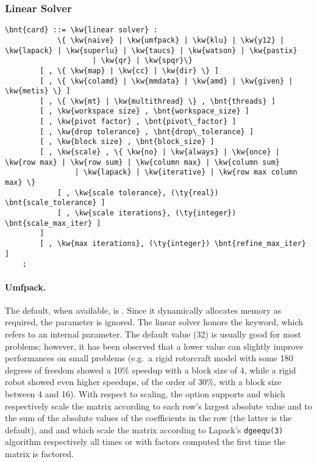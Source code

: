 \subsubsection{Linear Solver}   
\label{sec:LINEAR-SOLVER}
\begin{Verbatim}[commandchars=\\\{\}]
    \bnt{card} ::= \kw{linear solver} :
            \{ \kw{naive} | \kw{umfpack} | \kw{klu} | \kw{y12} | \kw{lapack} | \kw{superlu} | \kw{taucs} | \kw{watson} | \kw{pastix}
                    | \kw{qr} | \kw{spqr}\}
        [ , \{ \kw{map} | \kw{cc} | \kw{dir} \} ]
        [ , \{ \kw{colamd} | \kw{mmdata} | \kw{amd} | \kw{given} | \kw{metis} \} ]
        [ , \{ \kw{mt} | \kw{multithread} \} , \bnt{threads} ]
        [ , \kw{workspace size} , \bnt{workspace_size} ] 
        [ , \kw{pivot factor} , \bnt{pivot\_factor} ]
        [ , \kw{drop tolerance} , \bnt{drop\_tolerance} ]
        [ , \kw{block size} , \bnt{block_size} ]
        [ , \kw{scale} , \{ \kw{no} | \kw{always} | \kw{once} | \kw{row max} | \kw{row sum} | \kw{column max} | \kw{column sum}
                | \kw{lapack} | \kw{iterative} | \kw{row max column max} \}
            [ , \kw{scale tolerance}, (\ty{real}) \bnt{scale_tolerance} ]
            [ , \kw{scale iterations}, (\ty{integer}) \bnt{scale_max_iter} ]
        ]
        [ , \kw{max iterations}, (\ty{integer}) \bnt{refine_max_iter} ]
    ;
\end{Verbatim}

\paragraph{Umfpack.}
The default, when available, is .
Since it dynamically allocates memory as required, the  
parameter is ignored.
The  linear solver honors the  keyword,
which refers to an internal parameter.
The default value (32) is usually good for most problems; however,
it has been observed that a lower value can slightly improve
performances on small problems (e.g.\ a rigid rotorcraft model
with some 180 degrees of freedom showed a 10\% speedup with 
a block size of 4, while a rigid robot showed even higher speedups,
of the order of 30\%, with a block size between 4 and 16).
With respect to scaling, the  option supports  and 
which respectively scale the matrix according to each row's
largest absolute value and to the sum of the absolute values
of the coefficients in the row (the latter is the default),
and  and  which scale the matrix
according to Lapack's \texttt{dgeequ(3)} algorithm
respectively all times or with factors computed the first time
the matrix is factored.

